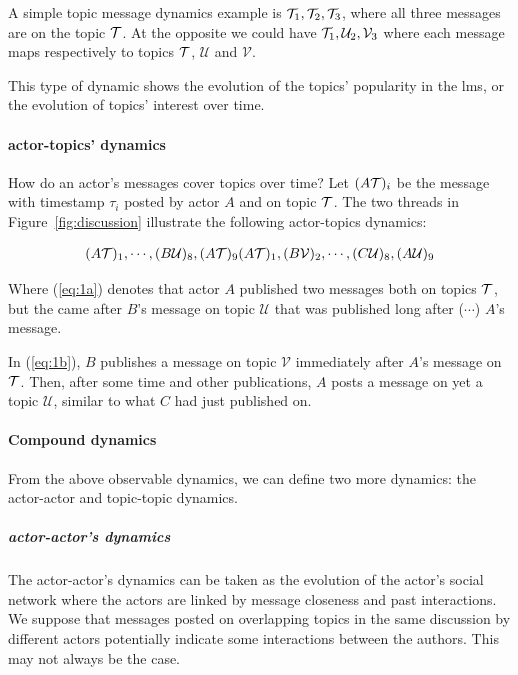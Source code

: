 \documentclass[a4paper,twoside]{article}
\newcommand{\V}{\mathcal{V}}
\newcommand{\U}{\mathcal{U}}
\begin{document}
A simple topic message dynamics example is $\mathcal{T}_1, \mathcal{T}_2, \mathcal{T}_3$, where all three messages are on the topic $\mathcal{T}$.  At the opposite we could have $\T_1, \U_2, \V_3$ where each message maps respectively to topics $\mathcal{T}$, $\U$ and $\V$.

This type of dynamic shows the evolution of the topics' popularity in the \gls{lms}, or the evolution of topics' interest over time.


\paragraph{actor-topics' dynamics}
How do an actor's messages cover topics over time? Let $(A\mathcal{T})_i$ be the message with timestamp $\tau_i$ posted by actor $A$ and on topic $\mathcal{T}$.  The two threads in Figure~\ref{fig:discussion} illustrate the following actor-topics dynamics:


\begin{subequations}
 \begin{align}
  \label{eq:1a}
  (A\T)_1, \cdots{}, (B\U)_8, (A\T)_9
 \end{align}
 \begin{align}
  \label{eq:1b}
  (A\T)_1, (B\V)_2, \cdots{}, (C\U)_8, (A\U)_9
 \end{align}
\end{subequations}

Where (\ref{eq:1a}) denotes that actor $A$ published two messages both on topics $\mathcal{T}$, but the  came after $B$'s message on topic $\U$ that was published long after ($\cdots$) $A$'s  message.

In (\ref{eq:1b}), $B$ publishes a message on topic $\V$ immediately after $A$'s message on $\mathcal{T}$.  Then, after some time and other publications, $A$ posts a message on yet a  topic $\U$, similar to what $C$ had just published on.


\paragraph{Compound dynamics}
From the above observable dynamics, we can define two more dynamics: the actor-actor and topic-topic dynamics.

\subparagraph{actor-actor's dynamics}

The actor-actor's dynamics can be taken as the evolution of the actor's social network where the actors are linked by message closeness and past interactions.  We suppose that messages posted on overlapping topics in the same discussion by different actors potentially indicate some interactions between the authors.   This may not always be the case.
\end{document}
